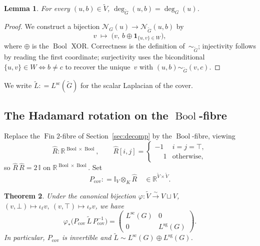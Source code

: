 \documentclass[11pt,a4paper]{amsart}
\theoremstyle{plain}
\newtheorem{theorem}{Theorem}[section]
\newtheorem{lemma}[theorem]{Lemma}
\theoremstyle{definition}
\theoremstyle{remark}
\newcommand{\RR}{\mathbb{R}}
\newcommand{\II}{\mathbb{I}}
\newcommand{\cN}{\mathcal{N}}
\newcommand{\kronprod}{\otimes_{\!K}}
\newcommand{\tG}{\widetilde{G}}
\newcommand{\tV}{\widetilde{V}}
\newcommand{\tL}{\widetilde{L}}
\newcommand{\Lscalar}{L^{\operatorname{sc}}}
\newcommand{\Lsigned}{L^{\operatorname{sg}}}
\newcommand{\defeq}{\mathrel{\mathop:}=}
\begin{document}
\begin{lemma}\label{lem:cover-degree}
  For every $(u,b)\in \tV$, $\deg_{\tG}(u,b) = \deg_G(u)$.
\end{lemma}

\begin{proof}
We construct a bijection $\cN_G(u)\to \cN_{\tG}(u,b)$ by
\[
  v \;\longmapsto\; \bigl(v,\ b\oplus \mathbf{1}_{\{u,v\}\in W}\bigr),
\]
where $\oplus$ is the $\operatorname{Bool}$ XOR. Correctness is the
definition of~$\sim_{\tG}$; injectivity follows by reading the
first coordinate; surjectivity uses the biconditional
$\{u,v\}\in W \Leftrightarrow b\ne c$ to recover the unique~$v$
with $(u,b)\sim_{\tG}(v,c)$.
\end{proof}

We write $\tL\defeq \Lscalar(\tG)$ for the scalar Laplacian of
the cover.

\subsection*{The Hadamard rotation on the $\operatorname{Bool}$-fibre}

Replace the $\operatorname{Fin}2$-fibre of Section~\ref{sec:decomp}
by the $\operatorname{Bool}$-fibre, viewing
\[
  \widehat R : \RR^{\operatorname{Bool}\times \operatorname{Bool}},
  \qquad \widehat R[i,j] = \begin{cases}
    -1 & i=j=\top,\\
    \phantom{-}1 & \text{otherwise},
  \end{cases}
\]
so $\widehat R\,\widehat R = 2\,\II$ on
$\RR^{\operatorname{Bool}\times \operatorname{Bool}}$. Set
\[
  P_{\mathrm{cov}} \defeq \II_V\kronprod \widehat R \quad \in \RR^{\tV\times \tV}.
\]

\begin{theorem}\label{thm:cover-splits}
Under the canonical bijection
$\varphi:\tV\xrightarrow{\sim} V\sqcup V$,
$(v,\bot)\mapsto \iota_\ell v,\ (v,\top)\mapsto \iota_r v$,
we have
\[
  \varphi_*\bigl(P_{\mathrm{cov}}\,\tL\,P_{\mathrm{cov}}^{-1}\bigr)
  = \begin{pmatrix} \Lscalar(G) & 0 \\ 0 & \Lsigned(G)\end{pmatrix}.
\]
In particular, $P_{\mathrm{cov}}$ is invertible and
$\tL\sim \Lscalar(G)\oplus\Lsigned(G)$.
\end{theorem}
\end{document}
